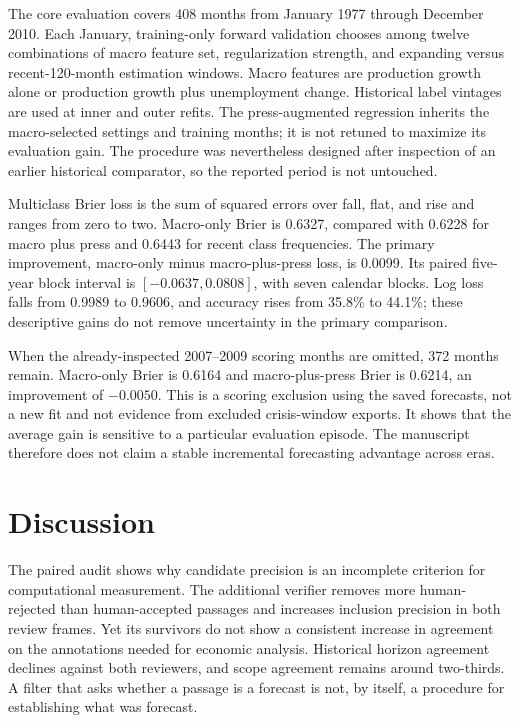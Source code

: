 \documentclass[iicol,pdflatex,sn-mathphys-num]{sn-jnl}
\begin{document}
The core evaluation covers 408 months from January 1977 through December 2010. Each January, training-only forward validation chooses among twelve combinations of macro feature set, regularization strength, and expanding versus recent-120-month estimation windows. Macro features are production growth alone or production growth plus unemployment change. Historical label vintages are used at inner and outer refits. The press-augmented regression inherits the macro-selected settings and training months; it is not retuned to maximize its evaluation gain. The procedure was nevertheless designed after inspection of an earlier historical comparator, so the reported period is not untouched.

Multiclass Brier loss is the sum of squared errors over fall, flat, and rise and ranges from zero to two. Macro-only Brier is 0.6327, compared with 0.6228 for macro plus press and 0.6443 for recent class frequencies. The primary improvement, macro-only minus macro-plus-press loss, is 0.0099. Its paired five-year block interval is $[-0.0637,0.0808]$, with seven calendar blocks. Log loss falls from 0.9989 to 0.9606, and accuracy rises from 35.8\% to 44.1\%; these descriptive gains do not remove uncertainty in the primary comparison.

When the already-inspected 2007--2009 scoring months are omitted, 372 months remain. Macro-only Brier is 0.6164 and macro-plus-press Brier is 0.6214, an improvement of $-0.0050$. This is a scoring exclusion using the saved forecasts, not a new fit and not evidence from excluded crisis-window exports. It shows that the average gain is sensitive to a particular evaluation episode. The manuscript therefore does not claim a stable incremental forecasting advantage across eras.

\section{Discussion}
The paired audit shows why candidate precision is an incomplete criterion for computational measurement. The additional verifier removes more human-rejected than human-accepted passages and increases inclusion precision in both review frames. Yet its survivors do not show a consistent increase in agreement on the annotations needed for economic analysis. Historical horizon agreement declines against both reviewers, and scope agreement remains around two-thirds. A filter that asks whether a passage is a forecast is not, by itself, a procedure for establishing what was forecast.
\end{document}
